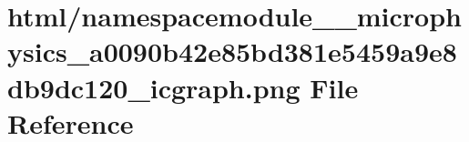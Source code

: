 \hypertarget{namespacemodule____microphysics__a0090b42e85bd381e5459a9e8db9dc120__icgraph_8png}{}\section{html/namespacemodule\+\_\+\+\_\+microphysics\+\_\+a0090b42e85bd381e5459a9e8db9dc120\+\_\+icgraph.png File Reference}
\label{namespacemodule____microphysics__a0090b42e85bd381e5459a9e8db9dc120__icgraph_8png}

